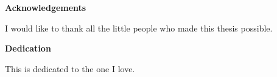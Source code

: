 \begin{center}\textbf{Acknowledgements}\end{center}

I would like to thank all the little people who made this thesis possible.
\cleardoublepage


\begin{center}\textbf{Dedication}\end{center}

This is dedicated to the one I love.
\cleardoublepage

\renewcommand\contentsname{Table of Contents}
\tableofcontents
\cleardoublepage
{}    %

\listoftables
\cleardoublepage
{}		%

\listoffigures
\cleardoublepage
{}		%

\printglossaries
\cleardoublepage
{}		%


